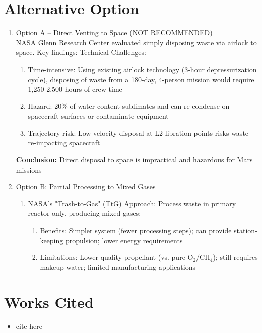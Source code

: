 \documentclass[12pt, a4paper]{article}
\begin{document}
\section{Alternative Option}
\begin{enumerate}
    \item{Option A -- Direct Venting to Space (NOT RECOMMENDED)} \\
    NASA Glenn Research Center evaluated simply disposing waste via airlock to space. Key findings:
    Technical Challenges:
    \begin{enumerate}
        \item Time-intensive: Using existing airlock technology (3-hour depressurization cycle), disposing of waste from a 180-day, 4-person mission would require 1,250-2,500 hours of crew time
        \item Hazard: 20\% of water content sublimates and can re-condense on spacecraft surfaces or contaminate equipment
        \item Trajectory risk: Low-velocity disposal at L2 libration points risks waste re-impacting spacecraft
    \end{enumerate}
    \textbf{Conclusion:} Direct disposal to space is impractical and hazardous for Mars missions

    \item Option B: Partial Processing to Mixed Gases
    \begin{enumerate}
        \item NASA's "Trash-to-Gas" (TtG) Approach: Process waste in primary reactor only, producing mixed gases:
        \begin{enumerate}
            \item Benefits: Simpler system (fewer processing steps); can provide station-keeping propulsion; lower energy requirements
            \item Limitations: Lower-quality propellant (vs. pure O$_2$/CH$_4$); still requires makeup water; limited manufacturing applications
        \end{enumerate}
    \end{enumerate}
\end{enumerate}

\newpage 
\section*{Works Cited}
\begin{itemize}
    \item cite here
\end{itemize}
\end{document}
